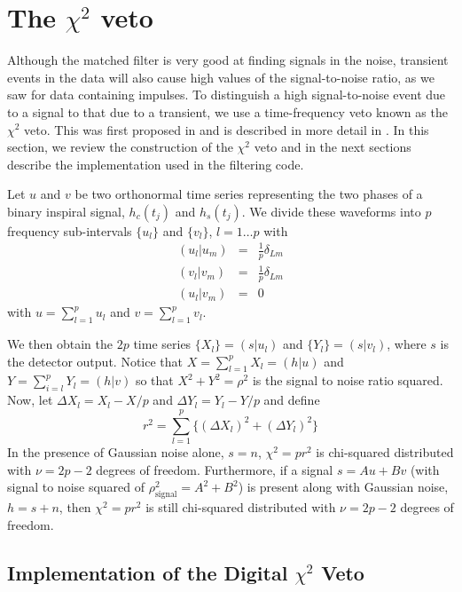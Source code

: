 \section{The $\chi^2$ veto}
\label{s:chisqcts}

Although the matched filter is very good at finding signals in the noise,
transient events in the data will also cause high values of the
signal-to-noise ratio, as we saw for data containing impulses. To distinguish
a high signal-to-noise event due to a signal to that due to a transient, we
use a time-frequency veto known as the $\chi^2$ veto. This was first proposed
in \cite{grasp} and is described in more detail in \cite{brucechisqpaper}.
In this section, we review the construction of the $\chi^2$ veto and in the
next sections describe the implementation used in the filtering code.

Let $u$ and $v$ be two orthonormal time series representing the two phases of a
binary inspiral signal, $h_c(t_j)$ and $h_s(t_j)$.  We divide these waveforms
into $p$ frequency sub-intervals $\{u_l\}$ and $\{v_l\}$, $l=1\ldots p$ with
\begin{eqnarray}
  (u_l|u_m) &=& \frac{1}{p}\delta_{Lm} \\
  (v_l|v_m) &=& \frac{1}{p}\delta_{Lm} \\
  (u_l|v_m) &=& 0
\end{eqnarray}
with $u=\sum_{l=1}^p u_l$ and $v=\sum_{l=1}^p v_l$.

We then obtain the $2p$ time series $\{X_l\}=(s|u_l)$ and $\{Y_l\}=(s|v_l)$,
where $s$ is the detector output. Notice that  $X=\sum_{l=1}^p X_l=(h|u)$ and
$Y=\sum_{i=l}^p Y_l=(h|v)$ so that $X^2+Y^2=\rho^2$ is the signal to noise
ratio squared. Now, let $\Delta X_l=X_l-X/p$ and $\Delta Y_l=Y_l-Y/p$ and
define
\begin{equation}
  r^2 = \sum_{l=1}^p \bigl\{ (\Delta X_l)^2 + (\Delta Y_l)^2 \bigr\}
\end{equation}
In the presence of Gaussian noise alone, $s=n$, $\chi^2=pr^2$ is chi-squared
distributed with $\nu=2p-2$ degrees of freedom.  Furthermore, if a signal
$s=Au+Bv$ (with signal to noise squared of $\rho^2_{\mathrm{signal}}=A^2+B^2$) 
is present along with Gaussian noise, $h=s+n$, then $\chi^2=pr^2$ is still
chi-squared distributed with $\nu=2p-2$ degrees of freedom.

\subsection{Implementation of the Digital $\chi^2$ Veto}
\label{ss:chisqdisc}

